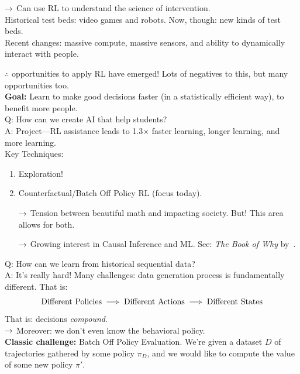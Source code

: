 $\rightarrow$ Can use RL to understand the science of intervention. \\

Historical test beds: video games and robots. Now, though: new kinds of test beds. \\

Recent changes: massive compute, massive sensors, and ability to dynamically interact with people. 

$\therefore$ opportunities to apply RL have emerged! Lots of negatives to this, but many opportunities too. \\

{\bf Goal:} Learn to make good decisions faster (in a statistically efficient way), to benefit more people. \\

Q: How can we create AI that help students? \\

A: Project---RL assistance leads to 1.3$\times$ faster learning, longer learning, and more learning. \\

Key Techniques:
\begin{enumerate}
    \item Exploration!
    \item Counterfactual/Batch Off Policy RL (focus today).
    
    $\rightarrow$ Tension between beautiful math and impacting society. But! This area allows for both.
    
    $\rightarrow$ Growing interest in Causal Inference and ML. See: {\it The Book of Why} by~\citet{pearl2018book}.
\end{enumerate}

Q: How can we learn from historical sequential data? \\

A: It's really hard! Many challenges: data generation process is fundamentally different. That is:
\[
\text{Different Policies} \implies \text{Different Actions} \implies \text{Different States}
\]
That is: decisions {\it compound}. \\

$\rightarrow$ Moreover: we don't even know the behavioral policy. \\

{\bf Classic challenge:} Batch Off Policy Evaluation. We're given a dataset $D$ of trajectories gathered by some policy $\pi_D$, and we would like to compute the value of some new policy $\pi'$. \\

